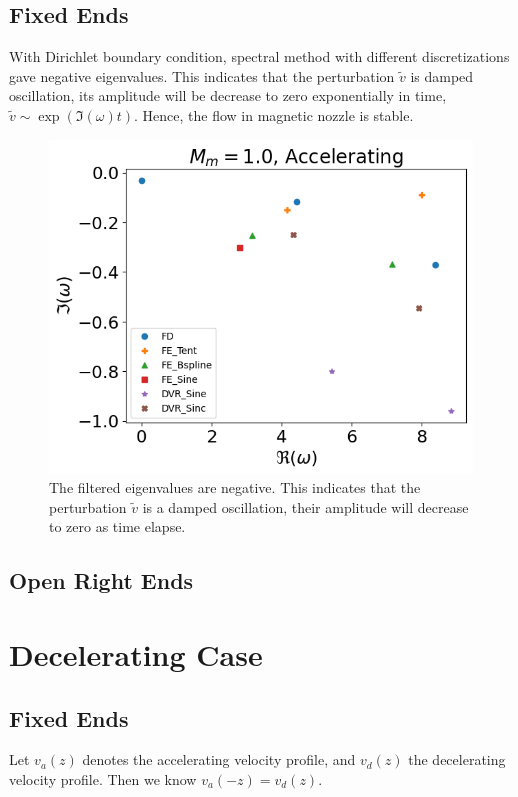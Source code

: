 \subsection{Fixed Ends}
With Dirichlet boundary condition, spectral method with different discretizations gave negative eigenvalues. This indicates that the perturbation $\tilde{v}$ is damped oscillation, its amplitude will be decrease to zero exponentially in time, $\tilde{v} \sim \exp(\Im(\omega)t)$. Hence, the flow in magnetic nozzle is stable.
\begin{figure} [H]
	\centering
	\includegraphics[width=0.7\linewidth]{img/numerical_experiments/accelerating_v}
	\caption{The filtered eigenvalues are negative. This indicates that the perturbation $\tilde{v}$ is a damped oscillation, their amplitude will decrease to zero as time elapse.}
	\label{fig:accelerating_v}
\end{figure}

\subsection{Open Right Ends}


\section{Decelerating Case}
\subsection{Fixed Ends}
Let $v_a(z)$ denotes the accelerating velocity profile, and $v_d(z)$ the decelerating velocity profile. Then we know $v_a(-z) = v_d(z)$.

